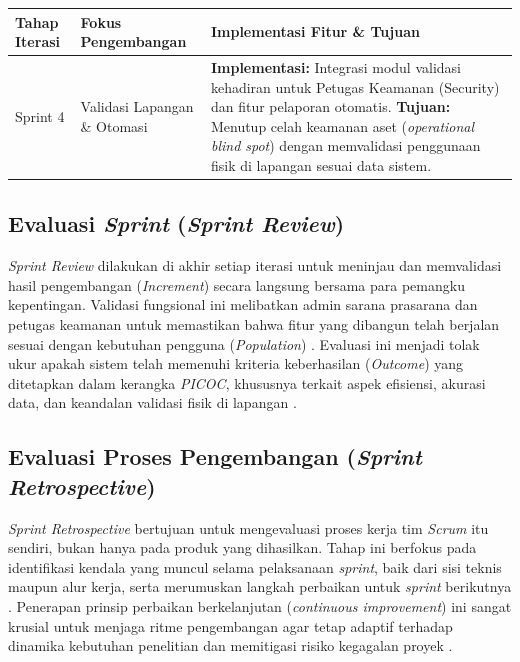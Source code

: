 \newpage

\begin{table}[htbp]
    \centering
    \normalsize
    \begin{tabular}{|p{2cm}|p{4cm}|p{8cm}|}
        \hline
        \textbf{Tahap Iterasi} & \textbf{Fokus Pengembangan} & \textbf{Implementasi Fitur \& Tujuan} \\
        \hline
        Sprint 4 & Validasi Lapangan \& Otomasi & \textbf{Implementasi:} Integrasi modul validasi kehadiran untuk Petugas Keamanan (Security) dan fitur pelaporan otomatis. \newline \textbf{Tujuan:} Menutup celah keamanan aset (\textit{operational blind spot}) dengan memvalidasi penggunaan fisik di lapangan sesuai data sistem. \\
        \hline
    \end{tabular}
\end{table}

\subsection{Evaluasi \textit{Sprint} (\textit{Sprint Review})}
\textit{Sprint Review} dilakukan di akhir setiap iterasi untuk meninjau dan memvalidasi hasil pengembangan (\textit{Increment}) secara langsung bersama para pemangku kepentingan. Validasi fungsional ini melibatkan admin sarana prasarana dan petugas keamanan untuk memastikan bahwa fitur yang dibangun telah berjalan sesuai dengan kebutuhan pengguna (\textit{Population}) \parencite{Velasquez-Jimenez2025}. Evaluasi ini menjadi tolak ukur apakah sistem telah memenuhi kriteria keberhasilan (\textit{Outcome}) yang ditetapkan dalam kerangka \textit{PICOC}, khususnya terkait aspek efisiensi, akurasi data, dan keandalan validasi fisik di lapangan \parencite{Putrianasari2024}.

\subsection{Evaluasi Proses Pengembangan (\textit{Sprint Retrospective})}
\textit{Sprint Retrospective} bertujuan untuk mengevaluasi proses kerja tim \textit{Scrum} itu sendiri, bukan hanya pada produk yang dihasilkan. Tahap ini berfokus pada identifikasi kendala yang muncul selama pelaksanaan \textit{sprint}, baik dari sisi teknis maupun alur kerja, serta merumuskan langkah perbaikan untuk \textit{sprint} berikutnya \parencite{permana2015scrum}. Penerapan prinsip perbaikan berkelanjutan (\textit{continuous improvement}) ini sangat krusial untuk menjaga ritme pengembangan agar tetap adaptif terhadap dinamika kebutuhan penelitian dan memitigasi risiko kegagalan proyek \parencite{Putrianasari2024}.




